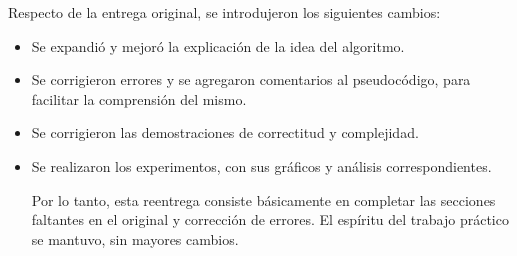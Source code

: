 Respecto de la entrega original, se introdujeron los siguientes cambios:

\begin{itemize}
\item Se expandió y mejoró la explicación de la idea del algoritmo.

\item Se corrigieron errores y se agregaron comentarios al pseudocódigo, para
facilitar la comprensión del mismo.

\item Se corrigieron las demostraciones de correctitud y complejidad.

\item Se realizaron los experimentos, con sus gráficos y análisis correspondientes.

Por lo tanto, esta reentrega consiste básicamente en completar las secciones
faltantes en el original y corrección de errores. El espíritu del trabajo práctico se mantuvo, sin mayores cambios.
\end{itemize}

